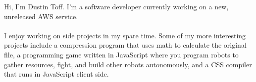 \parbox {\textwidth} {
    Hi, I'm Dustin Toff. I'm a software developer currently working on a new, unreleased AWS service.
    \\~\\
    I enjoy working on side projects in my spare time. Some of my more interesting projects include a compression program that uses math to calculate the original file, a programming game written in JavaScript where you program robots to gather resources, fight, and build other robots autonomously, and a CSS compiler that runs in JavaScript client side.
}
